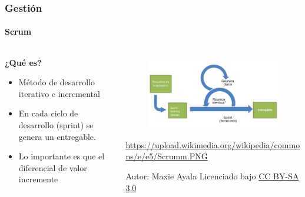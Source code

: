 \begin{frame}
	\frametitle{Gesti\'on}
	\framesubtitle{Scrum}
	\begin{columns}[T] %
		
		\begin{column}[T]{0.5\linewidth} %
			\textbf{¿Qu\'e es?}
			\begin{itemize}
				\item M\'etodo de desarrollo iterativo e incremental
				\item En cada ciclo de desarrollo (sprint) se genera un 
				entregable.
				\item Lo importante es que el diferencial de valor incremente
			\end{itemize}
		\end{column}
		\begin{column}[T]{0.5\linewidth} %
			\begin{figure}
				\includegraphics[width=1.0\linewidth]{./Figures/Scrumm.PNG}
				\label{scrum}
			\end{figure}
			\tiny{\url{https://upload.wikimedia.org/wikipedia/commons/e/e5/Scrumm.PNG}
					
					Autor: Maxie Ayala 
					Licenciado bajo 
					\hyperlink{creativecommons.org/licenses/by-sa/3.0/}{CC 
					BY-SA 3.0}}
		\end{column}
	\end{columns}

\end{frame}

